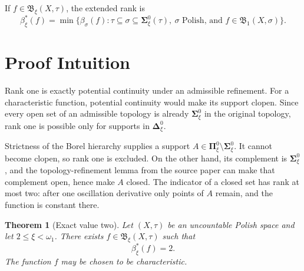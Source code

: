 \documentclass[11pt]{article}
\newtheorem{theorem}{Theorem}
\newcommand{\B}{\mathfrak{B}}
\newcommand{\borelSigma}{\boldsymbol{\Sigma}}
\newcommand{\borelPi}{\boldsymbol{\Pi}}
\newcommand{\borelDelta}{\boldsymbol{\Delta}}
\begin{document}
If $f\in\B_\xi(X,\tau)$, the extended rank is
\[
  \beta^*_\xi(f)=
  \min\bigl\{\beta_\sigma(f):
  \tau\subseteq\sigma\subseteq\borelSigma^0_\xi(\tau),\
  \sigma\text{ Polish, and }f\in\B_1(X,\sigma)\bigr\}.
\]

\section*{Proof Intuition}

Rank one is exactly potential continuity under an admissible refinement.
For a characteristic function, potential continuity would make its support
clopen.  Since every open set of an admissible topology is already
$\borelSigma^0_\xi$ in the original topology, rank one is possible only for
supports in $\borelDelta^0_\xi$.

Strictness of the Borel hierarchy supplies a support
$A\in\borelPi^0_\xi\setminus\borelSigma^0_\xi$.  It cannot become clopen, so
rank one is excluded.  On the other hand, its complement is
$\borelSigma^0_\xi$, and the topology-refinement lemma from the source paper
can make that complement open, hence make $A$ closed.  The indicator of a
closed set has rank at most two: after one oscillation derivative only points
of $A$ remain, and the function is constant there.

\begin{theorem}[Exact value two]
Let $(X,\tau)$ be an uncountable Polish space and let
$2\leq\xi<\omega_1$.  There exists $f\in\B_\xi(X,\tau)$ such that
\[
  \beta^*_\xi(f)=2.
\]
The function $f$ may be chosen to be characteristic.
\end{theorem}
\end{document}
